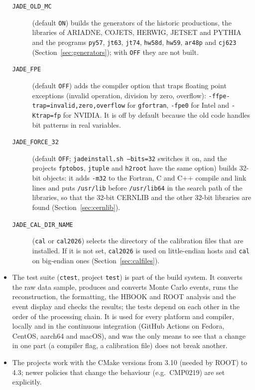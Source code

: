 \begin{itemize}
\begin{description}
\item[\texttt{JADE\_OLD\_MC}] (default \texttt{ON}) builds the generators of the historic productions, the libraries of ARIADNE, COJETS, HERWIG, JETSET and PYTHIA and the programs \texttt{py57}, \texttt{jt63}, \texttt{jt74}, \texttt{hw58d},
\texttt{hw59}, \texttt{ar48p} and \texttt{cj623} (Section~\ref{sec:generators}); with \texttt{OFF} they are not built.
\item[\texttt{JADE\_FPE}] (default \texttt{OFF}) adds the compiler option that traps floating point exceptions (invalid operation, division by zero, overflow): \texttt{-ffpe-trap=invalid,\allowbreak{}zero,\allowbreak{}overflow} for \texttt{gfortran},
\texttt{-fpe0} for Intel and \texttt{-Ktrap=fp} for NVIDIA. It is off by default because the old code handles bit patterns in real variables.
\item[\texttt{JADE\_FORCE\_32}] (default \texttt{OFF}; \texttt{jadeinstall.sh --bits=32} switches it on, and the projects \texttt{fptobos}, \texttt{jtuple} and \texttt{h2root} have the same option) builds 32-bit objects: it adds \texttt{-m32} to the Fortran, C and C++ compile and link
lines and puts \texttt{/usr/lib} before \texttt{/usr/lib64} in the search path of the libraries, so that the 32-bit CERNLIB and the other 32-bit libraries are found (Section~\ref{sec:cernlib}).
\item[\texttt{JADE\_CAL\_DIR\_NAME}] (\texttt{cal} or \texttt{cal2026}) selects the directory of the calibration files that are installed. If it is not set, \texttt{cal2026} is used on little-endian hosts and \texttt{cal} on big-endian ones
(Section~\ref{sec:calfiles}).
\end{description}
\item The test suite (\texttt{ctest}, project \texttt{test}) is part of the build system. It converts the raw data
sample, produces and converts Monte Carlo events, runs the reconstruction, the formatting, the HBOOK and ROOT
analysis and the event display and checks the results; the tests depend on each other in the order of the
processing chain. It is used for every platform and compiler, locally and in the continuous integration
(GitHub Actions on Fedora, CentOS, aarch64 and macOS), and was the only means to see that a change in
one part (a compiler flag, a calibration file) does not break another.
\item The projects work with the CMake versions from 3.10 (needed by ROOT) to 4.3; newer policies
that change the behaviour (e.g.\ CMP0219) are set explicitly.
\end{itemize}


